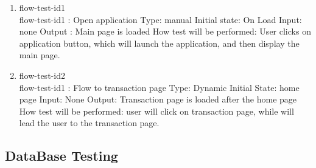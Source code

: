 \documentclass[12pt, titlepage]{article}
\begin{document}
\begin{enumerate}

\item{flow-test-id1\\}
flow-test-id1 : Open application
\newline
Type: manual 
\newline
Initial state: On Load 
\newline
Input: none
\newline
Output : Main page is loaded 
\newline
How test will be performed: User clicks on application button, which will launch the application, and then display the main page. 



					
\item{flow-test-id2\\}
flow-test-id1 : Flow to transaction page
\newline
Type: Dynamic
\newline
Initial State: home page 
\newline
Input: None
\newline
Output: Transaction page is loaded after the home page 
\newline
How test will be performed:  user will click on transaction page, while will lead the user to the transaction page. 



\end{enumerate}

\subsection{DataBase Testing}
\end{document}

